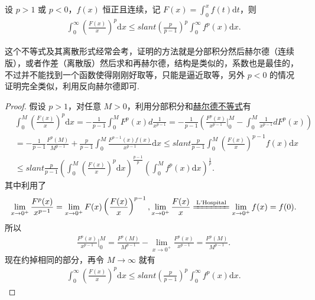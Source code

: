 \documentclass[../../main.tex]{subfiles}
\begin{document}
\begin{theorem}[Hardy不等式]\label{theorem:Hardy(哈代)不等式}
设 $p > 1$ 或 $p < 0$，$f(x)$ 恒正且连续，记 $F(x) = \int_0^x f(t) \mathrm{d}t$，则
\begin{align*}
\int_0^\infty \left( \frac{F(x)}{x} \right)^p \mathrm{d}x \leqslant slant \left( \frac{p}{p - 1} \right)^p \int_0^\infty f^p(x) \mathrm{d}x.
\end{align*}
\end{theorem}
\begin{remark}
这个不等式及其离散形式经常会考，证明的方法就是分部积分然后赫尔德（连续版），或者作差（离散版）然后求和再赫尔德，结构是类似的，系数也是最佳的，不过并不能找到一个函数使得刚刚好取等，只能是逼近取等，另外 $p < 0$ 的情况证明完全类似，利用反向赫尔德即可.
\end{remark}
\begin{proof}
假设 $p > 1$，对任意 $M > 0$，利用分部积分和\hyperref[theorem:Hold(赫尔德)不等式(积分形式)]{赫尔德不等式}有
\begin{align*}
&\int_0^M \left( \frac{F(x)}{x} \right)^p \mathrm{d}x = -\frac{1}{p - 1} \int_0^M F^p(x) d\frac{1}{x^{p - 1}} = -\frac{1}{p - 1} \left( \frac{F^p(x)}{x^{p - 1}} \bigg|_0^M - \int_0^M \frac{1}{x^{p - 1}} dF^p(x) \right)
\\
&= -\frac{1}{p - 1} \frac{F^p(M)}{M^{p - 1}} + \frac{p}{p - 1} \int_0^M \frac{F^{p - 1}(x) f(x)}{x^{p - 1}} \mathrm{d}x \leqslant slant \frac{p}{p - 1} \int_0^M \left( \frac{F(x)}{x} \right)^{p - 1} f(x) \mathrm{d}x
\\
&\leqslant slant \frac{p}{p - 1} \left( \int_0^M \left( \frac{F(x)}{x} \right)^p \mathrm{d}x \right)^{\frac{p - 1}{p}} \left( \int_0^M f^p(x) \mathrm{d}x \right)^{\frac{1}{p}}.
\end{align*}
其中利用了
\begin{align*}
\lim_{x \to 0^+} \frac{F^p(x)}{x^{p - 1}} = \lim_{x \to 0^+} F(x) \left( \frac{F(x)}{x} \right)^{p - 1}, \lim_{x \to 0^+} \frac{F(x)}{x} \xlongequal{\text{L'Hospital}} \lim_{x \to 0^+} f(x) = f(0).
\end{align*}
所以
\begin{align*}
\frac{F^p(x)}{x^{p - 1}} \bigg|_0^M = \frac{F^p(M)}{M^{p - 1}} - \lim_{x \to 0^+} \frac{F^p(x)}{x^{p - 1}} = \frac{F^p(M)}{M^{p - 1}}.
\end{align*}
现在约掉相同的部分，再令 $M \to \infty$ 就有
\begin{align*}
\int_0^\infty \left( \frac{F(x)}{x} \right)^p \mathrm{d}x \leqslant slant \left( \frac{p}{p - 1} \right)^p \int_0^\infty f^p(x) \mathrm{d}x.
\end{align*}
\end{proof}
\end{document}
